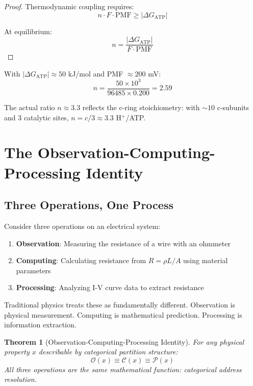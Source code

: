 \documentclass[twocolumn,10pt]{article}
\newtheorem{theorem}{Theorem}[section]
\theoremstyle{definition}
\theoremstyle{remark}
\newcommand{\Obs}{\mathcal{O}}
\newcommand{\Comp}{\mathcal{C}}
\newcommand{\Proc}{\mathcal{P}}
\begin{document}
\begin{proof}
Thermodynamic coupling requires:
\begin{equation}
n \cdot F \cdot \text{PMF} \geq |\Delta G_{\text{ATP}}|
\end{equation}

At equilibrium:
\begin{equation}
n = \frac{|\Delta G_{\text{ATP}}|}{F \cdot \text{PMF}}
\end{equation}
\end{proof}

With $|\Delta G_{\text{ATP}}| \approx 50$ kJ/mol and PMF $\approx 200$ mV:
\begin{equation}
n = \frac{50 \times 10^3}{96485 \times 0.200} = 2.59
\end{equation}

The actual ratio $n \approx 3.3$ reflects the c-ring stoichiometry: with $\sim 10$ c-subunits and 3 catalytic sites, $n = c/3 \approx 3.3$ H$^+$/ATP.

\section{The Observation-Computing-Processing Identity}
\label{sec:identity}

\subsection{Three Operations, One Process}

Consider three operations on an electrical system:

\begin{enumerate}
    \item \textbf{Observation}: Measuring the resistance of a wire with an ohmmeter
    \item \textbf{Computing}: Calculating resistance from $R = \rho L/A$ using material parameters
    \item \textbf{Processing}: Analyzing I-V curve data to extract resistance
\end{enumerate}

Traditional physics treats these as fundamentally different. Observation is physical measurement. Computing is mathematical prediction. Processing is information extraction.

\begin{theorem}[Observation-Computing-Processing Identity]
\label{thm:identity}
For any physical property $x$ describable by categorical partition structure:
\begin{equation}
\boxed{\Obs(x) \equiv \Comp(x) \equiv \Proc(x)}
\end{equation}
All three operations are the same mathematical function: categorical address resolution.
\end{theorem}
\end{document}
